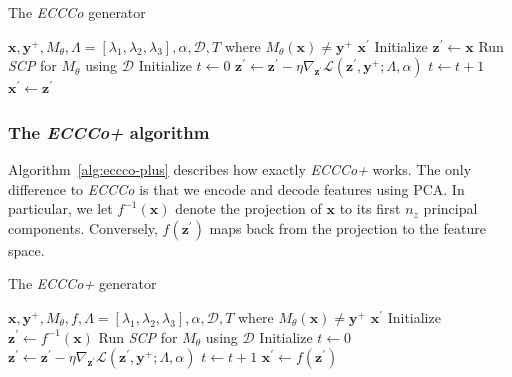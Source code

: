 \begin{algorithm*}[h]
  \caption{The \textit{ECCCo} generator}\label{alg:eccco}
  \begin{algorithmic}[1]
    \Require $\mathbf{x}, \mathbf{y}^+, M_{\theta}, \Lambda=[\lambda_1,\lambda_2,\lambda_3], \alpha, \mathcal{D}, T$ where $M_{\theta}(\mathbf{x})\neq\mathbf{y}^+$
    \Ensure $\mathbf{x}^\prime$
    \State Initialize $\mathbf{z}^\prime \gets \mathbf{x}$ 
    \State Run \textit{SCP} for $M_{\theta}$ using $\mathcal{D}$ 
    \State Initialize $t \gets 0$
     
    \State $\mathbf{z}^\prime \gets \mathbf{z}^\prime - \eta \nabla_{\mathbf{z}^\prime} \mathcal{L}(\mathbf{z}^\prime,\mathbf{y}^+; \Lambda, \alpha)$ 
    \State $t \gets t+1$
    \EndWhile
    \State $\mathbf{x}^\prime \gets \mathbf{z}^\prime$
  \end{algorithmic}
\end{algorithm*}

\subsubsection{The \textit{ECCCo+} algorithm}

Algorithm~\ref{alg:eccco-plus} describes how exactly \textit{ECCCo+} works. The only difference to \textit{ECCCo} is that we encode and decode features using PCA. In particular, we let $f^{-1}(\mathbf{x})$ denote the projection of $\mathbf{x}$ to its first $n_z$ principal components. Conversely, $f(\mathbf{z}^\prime)$ maps back from the projection to the feature space. 

\begin{algorithm*}[h]
  \caption{The \textit{ECCCo+} generator}\label{alg:eccco-plus}
  \begin{algorithmic}[1]
    \Require $\mathbf{x}, \mathbf{y}^+, M_{\theta}, f, \Lambda=[\lambda_1,\lambda_2,\lambda_3], \alpha, \mathcal{D}, T$ where $M_{\theta}(\mathbf{x})\neq\mathbf{y}^+$
    \Ensure $\mathbf{x}^\prime$
    \State Initialize $\mathbf{z}^\prime \gets f^{-1}(\mathbf{x})$ 
    \State Run \textit{SCP} for $M_{\theta}$ using $\mathcal{D}$ 
    \State Initialize $t \gets 0$
     
    \State $\mathbf{z}^\prime \gets \mathbf{z}^\prime - \eta \nabla_{\mathbf{z}^\prime} \mathcal{L}(\mathbf{z}^\prime,\mathbf{y}^+; \Lambda, \alpha)$ 
    \State $t \gets t+1$
    \EndWhile
    \State $\mathbf{x}^\prime \gets f(\mathbf{z}^\prime)$ 
  \end{algorithmic}
\end{algorithm*}

